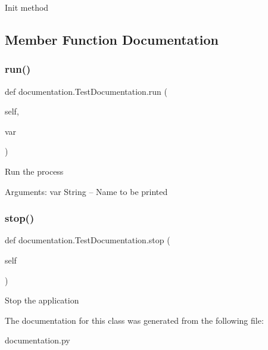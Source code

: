 \begin{DoxyVerb}Init method
\end{DoxyVerb}
 

\subsection{Member Function Documentation}
\mbox{\label{classdocumentation_1_1_test_documentation_ac16dcfbf318521a5b7d41c170a452004}} 
\subsubsection{\texorpdfstring{run()}{run()}}
{\footnotesize\ttfamily def documentation.\+Test\+Documentation.\+run (\begin{DoxyParamCaption}\item[{}]{self,  }\item[{}]{var }\end{DoxyParamCaption})}

\begin{DoxyVerb}Run the process

Arguments:
    var {String} -- Name to be printed
\end{DoxyVerb}
 \mbox{\label{classdocumentation_1_1_test_documentation_a2a1879fb99eedfa7347e5ae67c655bbf}} 
\subsubsection{\texorpdfstring{stop()}{stop()}}
{\footnotesize\ttfamily def documentation.\+Test\+Documentation.\+stop (\begin{DoxyParamCaption}\item[{}]{self }\end{DoxyParamCaption})}

\begin{DoxyVerb}Stop the application
\end{DoxyVerb}
 

The documentation for this class was generated from the following file\+:\begin{DoxyCompactItemize}
\item 
documentation.\+py\end{DoxyCompactItemize}
